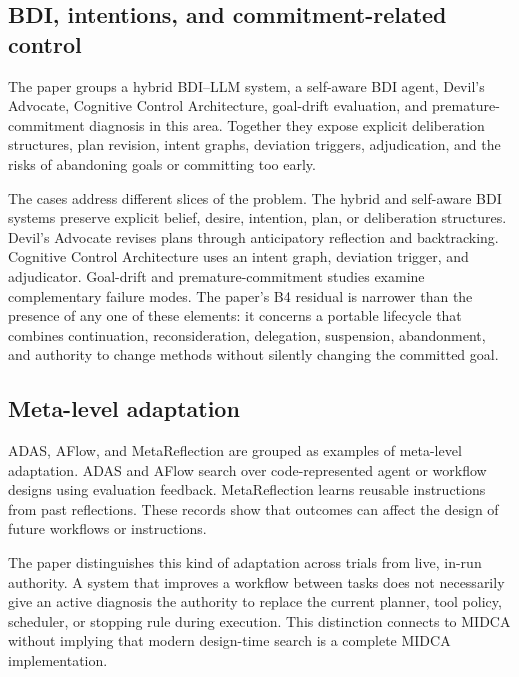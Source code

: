\subsection{BDI, intentions, and commitment-related control}

The paper groups a hybrid BDI--LLM system, a self-aware BDI agent, Devil's Advocate, Cognitive Control Architecture, goal-drift evaluation, and premature-commitment diagnosis in this area. Together they expose explicit deliberation structures, plan revision, intent graphs, deviation triggers, adjudication, and the risks of abandoning goals or committing too early.

The cases address different slices of the problem. The hybrid and self-aware BDI systems preserve explicit belief, desire, intention, plan, or deliberation structures. Devil's Advocate revises plans through anticipatory reflection and backtracking. Cognitive Control Architecture uses an intent graph, deviation trigger, and adjudicator. Goal-drift and premature-commitment studies examine complementary failure modes. The paper's B4 residual is narrower than the presence of any one of these elements: it concerns a portable lifecycle that combines continuation, reconsideration, delegation, suspension, abandonment, and authority to change methods without silently changing the committed goal.

\subsection{Meta-level adaptation}

ADAS, AFlow, and MetaReflection are grouped as examples of meta-level adaptation. ADAS and AFlow search over code-represented agent or workflow designs using evaluation feedback. MetaReflection learns reusable instructions from past reflections. These records show that outcomes can affect the design of future workflows or instructions.

The paper distinguishes this kind of adaptation across trials from live, in-run authority. A system that improves a workflow between tasks does not necessarily give an active diagnosis the authority to replace the current planner, tool policy, scheduler, or stopping rule during execution. This distinction connects to MIDCA without implying that modern design-time search is a complete MIDCA implementation.

